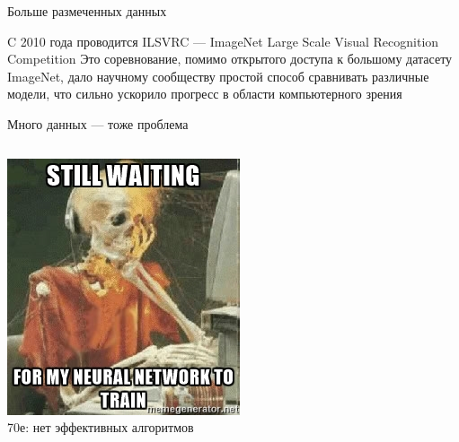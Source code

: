 \documentclass[aspectratio=169, professionalfonts]{beamer}
\begin{document}
\begin{frame}{Больше размеченных данных}
    \begin{outline}
        \1 C 2010 года проводится ILSVRC --- ImageNet Large Scale Visual
        Recognition Competition
        \1 Это соревнование, помимо открытого доступа к большому датасету
        ImageNet, дало научному сообществу простой способ сравнивать
        различные модели, что сильно ускорило прогресс в области компьютерного зрения
    \end{outline}
\end{frame}

\begin{frame}{Много данных --- тоже проблема}
    \begin{columns}
        \begin{column}{.49\linewidth}
            \centering
            \includegraphics[width=.8\linewidth]{graphs/fig28_1.jpg} \\
            70е: нет эффективных алгоритмов
        \end{column}
        \pause
        \begin{column}{.49\linewidth}
            \centering

\end{column}
\end{columns}
\end{frame}
\end{document}
